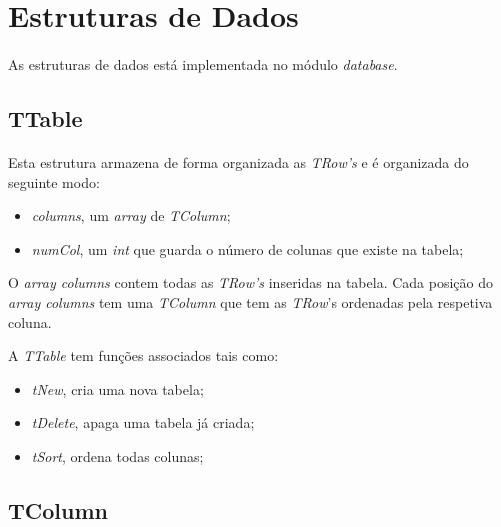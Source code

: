 \documentclass[a4paper, 10pt]{article}
\begin{document}
\section{Estruturas de Dados}
\label{sec:ED}

\paragraph{ }

As estruturas de dados está implementada no módulo \emph{database}.

\subsection{TTable}
\label{sssec:Table}

\paragraph{ }

Esta estrutura armazena de forma organizada as \emph{TRow's} e é organizada do seguinte modo:
\begin{itemize}
	\item \emph{columns}, um \emph{array} de \emph{TColumn};
	\item \emph{numCol}, um \emph{int} que guarda o número de colunas que existe na tabela;
\end{itemize}
O \emph{array columns} contem todas as \emph{TRow's} inseridas na tabela. Cada posição do \emph{array columns} tem uma \emph{TColumn} que tem as \emph{TRow}'s ordenadas pela respetiva coluna.

A \emph{TTable} tem funções associados tais como:
\begin{itemize}
	\item \emph{tNew}, cria uma nova tabela;
	\item \emph{tDelete}, apaga uma tabela já criada;
	\item \emph{tSort}, ordena todas colunas;
\end{itemize}

\subsection{TColumn}
\label{sssec:Column}

\paragraph{ }
\end{document}
